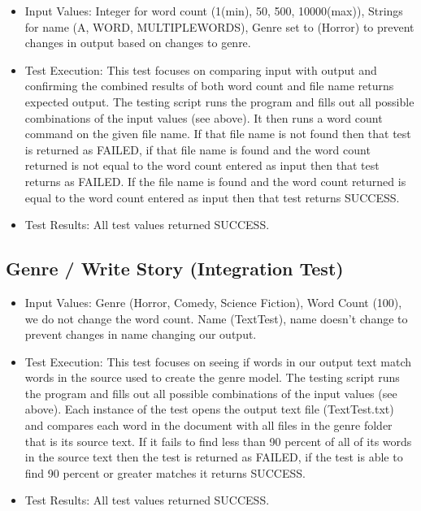 \documentclass[12pt]{article}
\begin{document}
\begin{itemize}
\item Input Values: Integer for word count (1(min), 50, 500, 10000(max)),\newline
Strings for name (A, WORD, MULTIPLEWORDS),\newline
Genre set to (Horror) to prevent changes in output based on changes to genre.
\item Test Execution: This test focuses on comparing input with output and confirming the combined results of both word count and file name returns expected output. The testing script runs the program and fills out all possible combinations of the input values (see above). It then runs a word count command on the given file name. If that file name is not found then that test is returned as FAILED, if that file name is found and the word count returned is not equal to the word count entered as input then that test returns as FAILED. If the file name is found and the word count returned is equal to the word count entered as input then that test returns SUCCESS.
\item Test Results: All test values returned SUCCESS.
\end{itemize}

\subsection{Genre / Write Story (Integration Test)}

\begin{itemize}
\item Input Values: Genre (Horror, Comedy, Science Fiction), \newline
Word Count (100), we do not change the word count.
Name (TextTest), name doesn't change to prevent changes in name changing our output.  
\item Test Execution: This test focuses on seeing if words in our output text match words in the source used to create the genre model. The testing script runs the program and fills out all possible combinations of the input values (see above). Each instance of the test opens the output text file (TextTest.txt) and compares each word in the document with all files in the genre folder that is its source text. If it fails to find less than 90 percent of all of its words in the source text then the test is returned as FAILED, if the test is able to find 90 percent or greater matches it returns SUCCESS.
\item Test Results: All test values returned SUCCESS.
\end{itemize}
\end{document}
